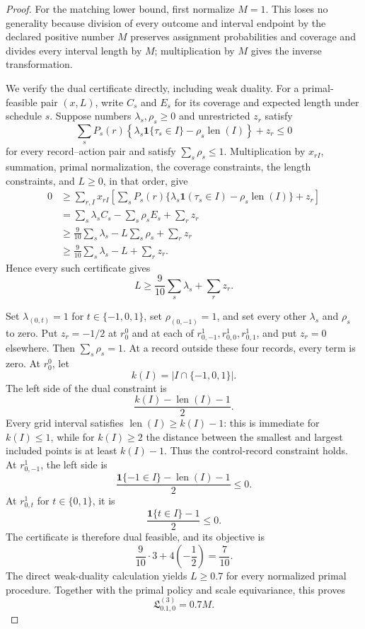\documentclass{article}
\begin{document}
\begin{proof}
For the matching lower bound, first normalize \(M=1\).  This loses no generality because division of every outcome and interval endpoint by the declared positive number \(M\) preserves assignment probabilities and coverage and divides every interval length by \(M\); multiplication by \(M\) gives the inverse transformation.

We verify the dual certificate directly, including weak duality.  For a primal-feasible pair \((x,L)\), write \(C_s\) and \(E_s\) for its coverage and expected length under schedule \(s\).  Suppose numbers \(\lambda_s,\rho_s\ge0\) and unrestricted \(z_r\) satisfy
\[
\sum_sP_s(r)\left\{\lambda_s\mathbf 1\{\tau_s\in I\}-\rho_s\operatorname{len}(I)\right\}+z_r\le0
\]
for every record--action pair and satisfy \(\sum_s\rho_s\le1\).  Multiplication by \(x_{rI}\), summation, primal normalization, the coverage constraints, the length constraints, and \(L\ge0\), in that order, give
\[
\begin{aligned}
0
&\ge \sum_{r,I}x_{rI}\left[\sum_sP_s(r)\{\lambda_s\mathbf 1(\tau_s\in I)-\rho_s\operatorname{len}(I)\}+z_r\right]\\
&=\sum_s\lambda_s C_s-\sum_s\rho_sE_s+\sum_rz_r\\
&\ge \frac9{10}\sum_s\lambda_s-L\sum_s\rho_s+\sum_rz_r\\
&\ge \frac9{10}\sum_s\lambda_s-L+\sum_rz_r.
\end{aligned}
\]
Hence every such certificate gives
\[
L\ge\frac9{10}\sum_s\lambda_s+\sum_rz_r.
\]

Set \(\lambda_{(0,t)}=1\) for \(t\in\{-1,0,1\}\), set \(\rho_{(0,-1)}=1\), and set every other \(\lambda_s\) and \(\rho_s\) to zero.  Put \(z_r=-1/2\) at \(r_0^0\) and at each of \(r_{0,-1}^1,r_{0,0}^1,r_{0,1}^1\), and put \(z_r=0\) elsewhere.  Then \(\sum_s\rho_s=1\).  At a record outside these four records, every term is zero.  At \(r_0^0\), let
\[
k(I)=|I\cap\{-1,0,1\}|.
\]
The left side of the dual constraint is
\[
\frac{k(I)-\operatorname{len}(I)-1}{2}.
\]
Every grid interval satisfies \(\operatorname{len}(I)\ge k(I)-1\): this is immediate for \(k(I)\le1\), while for \(k(I)\ge2\) the distance between the smallest and largest included points is at least \(k(I)-1\).  Thus the control-record constraint holds.  At \(r_{0,-1}^1\), the left side is
\[
\frac{\mathbf 1\{-1\in I\}-\operatorname{len}(I)-1}{2}\le0.
\]
At \(r_{0,t}^1\) for \(t\in\{0,1\}\), it is
\[
\frac{\mathbf 1\{t\in I\}-1}{2}\le0.
\]
The certificate is therefore dual feasible, and its objective is
\[
\frac9{10}\cdot3+4\left(-\frac12\right)=\frac7{10}.
\]
The direct weak-duality calculation yields \(L\ge0.7\) for every normalized primal procedure.  Together with the primal policy and scale equivariance, this proves
\[
\mathfrak L^{(3)}_{0.1,0}=0.7M.
\]


\end{proof}
\end{document}
